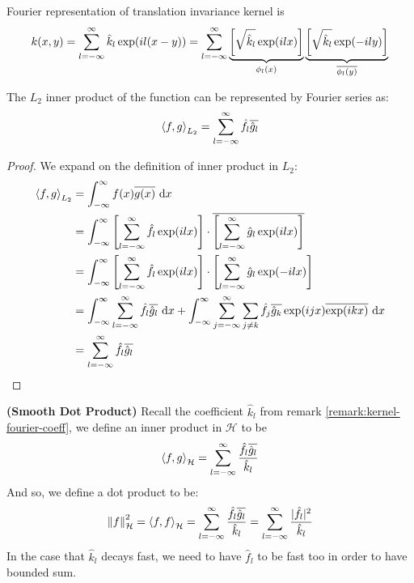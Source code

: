 \begin{remark}
    \label{remark:kernel-fourier-coeff}
    Fourier representation of translation invariance kernel is 
    \begin{equation*}
        k(x, y) = \sum^\infty_{l=-\infty} \hat{k}_l \exp(il(x-y)) = \sum^\infty_{l=-\infty}\underbrace{\left[ \sqrt{\hat{k}_l} \exp(ilx)  \right]}_{\phi_l(x)}\underbrace{\left[ \sqrt{\hat{k}_l}\exp(-ily) \right]}_{\overline{\phi_l(y)}}
    \end{equation*}
\end{remark}

\begin{proposition}
    The $L_2$ inner product of the function can be represented by Fourier series as:
    \begin{equation*}
        \left\langle f, g \right\rangle_{L_2} = \sum^\infty_{l=-\infty}\hat{f}_l\overline{\hat{g}_l}
    \end{equation*}
\end{proposition}
\begin{proof}
    We expand on the definition of inner product in $L_2$:
    \begin{equation*}
    \begin{aligned}
        \left\langle f, g \right\rangle_{L_2} &= \int^\infty_{-\infty} f(x)\overline{g(x)}\ \mathrm{d} x \\
        &=\int^\infty_{-\infty}\left[ \sum^\infty_{l=-\infty} \hat{f}_l \exp(ilx) \right]\cdot\overline{\left[ \sum^\infty_{l=-\infty}\hat{g}_l\exp(ilx) \right]} \\
        &=\int^\infty_{-\infty}\left[ \sum^\infty_{l=-\infty} \hat{f}_l \exp(ilx) \right]\cdot\left[ \sum^\infty_{l=-\infty}\hat{g}_l\exp(-ilx) \right] \\
        &=\int^\infty_{-\infty} \sum^\infty_{l=-\infty}\hat{f}_l\overline{\hat{g}_l}\ \mathrm{d} x + \int^\infty_{-\infty}\sum^\infty_{j=-\infty}\sum_{j\ne k}\hat{f}_j\overline{\hat{g}_k}\exp(ijx)\overline{\exp(ikx)}\ \mathrm{d} x \\
        &= \sum^\infty_{l=-\infty}\hat{f}_l\overline{\hat{g}_l}
    \end{aligned}
    \end{equation*}
\end{proof}

\begin{definition}{\textbf{(Smooth Dot Product)}}
    \label{def:dot-prod-fourier}
    Recall the coefficient $\hat{k}_l$ from remark \ref{remark:kernel-fourier-coeff}, we define an inner product in $\mathcal{H}$ to be 
    \begin{equation*}
        \left\langle f, g \right\rangle_\mathcal{H} = \sum^\infty_{l=-\infty} \frac{\hat{f}_l\overline{\hat{g}_l}}{\hat{k}_l}
    \end{equation*}
    And so, we define a dot product to be:
    \begin{equation*}
        \left\lVert f\right\rVert^2_\mathcal{H} = \left\langle f, f \right\rangle_\mathcal{H} = \sum^\infty_{l=-\infty} \frac{\hat{f}_l\overline{\hat{g}_l}}{\hat{k}_l} = \sum^\infty_{l=-\infty} \frac{|\hat{f}_l|^2}{\hat{k}_l}
    \end{equation*}
    In the case that $\hat{k}_l$ decays fast, we need to have $\hat{f}_l$ to be fast too in order to have bounded sum.
\end{definition}

